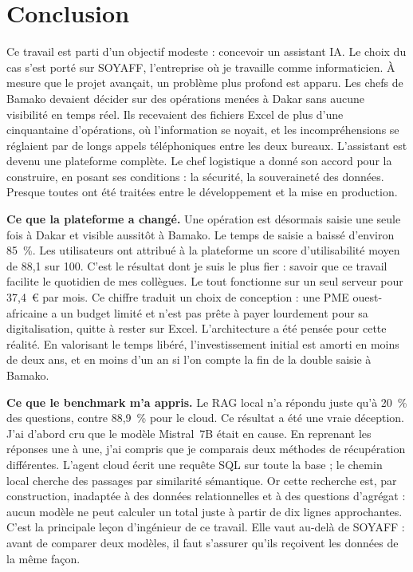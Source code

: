 \chapter*{Conclusion}
\label{chap:conclusion}

Ce travail est parti d'un objectif modeste : concevoir un assistant IA. Le choix du cas s'est porté sur SOYAFF, l'entreprise où je travaille comme informaticien. À mesure que le projet avançait, un problème plus profond est apparu. Les chefs de Bamako devaient décider sur des opérations menées à Dakar sans aucune visibilité en temps réel. Ils recevaient des fichiers Excel de plus d'une cinquantaine d'opérations, où l'information se noyait, et les incompréhensions se réglaient par de longs appels téléphoniques entre les deux bureaux. L'assistant est devenu une plateforme complète. Le chef logistique a donné son accord pour la construire, en posant ses conditions : la sécurité, la souveraineté des données. Presque toutes ont été traitées entre le développement et la mise en production.

\textbf{Ce que la plateforme a changé.} Une opération est désormais saisie une seule fois à Dakar et visible aussitôt à Bamako. Le temps de saisie a baissé d'environ 85~\%. Les utilisateurs ont attribué à la plateforme un score d'utilisabilité moyen de 88,1 sur 100. C'est le résultat dont je suis le plus fier : savoir que ce travail facilite le quotidien de mes collègues. Le tout fonctionne sur un seul serveur pour 37,4~€ par mois. Ce chiffre traduit un choix de conception : une PME ouest-africaine a un budget limité et n'est pas prête à payer lourdement pour sa digitalisation, quitte à rester sur Excel. L'architecture a été pensée pour cette réalité. En valorisant le temps libéré, l'investissement initial est amorti en moins de deux ans, et en moins d'un an si l'on compte la fin de la double saisie à Bamako.

\textbf{Ce que le benchmark m'a appris.} Le RAG local n'a répondu juste qu'à 20~\% des questions, contre 88,9~\% pour le cloud. Ce résultat a été une vraie déception. J'ai d'abord cru que le modèle Mistral~7B était en cause. En reprenant les réponses une à une, j'ai compris que je comparais deux méthodes de récupération différentes. L'agent cloud écrit une requête SQL sur toute la base ; le chemin local cherche des passages par similarité sémantique. Or cette recherche est, par construction, inadaptée à des données relationnelles et à des questions d'agrégat : aucun modèle ne peut calculer un total juste à partir de dix lignes approchantes. C'est la principale leçon d'ingénieur de ce travail. Elle vaut au-delà de SOYAFF : avant de comparer deux modèles, il faut s'assurer qu'ils reçoivent les données de la même façon.


